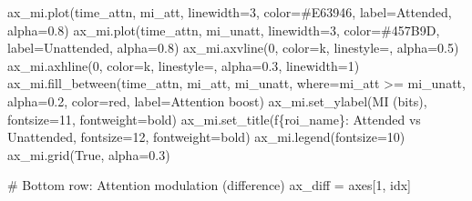 \documentclass[
  11pt,
  letterpaper,
  oneside,
  openany]{book}
\newenvironment{Shaded}{\begin{snugshade}}{\end{snugshade}}
\newcommand{\CommentTok}[1]{\textcolor[rgb]{0.37,0.37,0.37}{#1}}
\newcommand{\DecValTok}[1]{\textcolor[rgb]{0.68,0.00,0.00}{#1}}
\newcommand{\FloatTok}[1]{\textcolor[rgb]{0.68,0.00,0.00}{#1}}
\newcommand{\NormalTok}[1]{\textcolor[rgb]{0.00,0.23,0.31}{#1}}
\newcommand{\OperatorTok}[1]{\textcolor[rgb]{0.37,0.37,0.37}{#1}}
\newcommand{\SpecialCharTok}[1]{\textcolor[rgb]{0.37,0.37,0.37}{#1}}
\newcommand{\SpecialStringTok}[1]{\textcolor[rgb]{0.13,0.47,0.30}{#1}}
\newcommand{\StringTok}[1]{\textcolor[rgb]{0.13,0.47,0.30}{#1}}
\newcommand{\VariableTok}[1]{\textcolor[rgb]{0.07,0.07,0.07}{#1}}
\begin{document}
\begin{Shaded}
\begin{Highlighting}[]
\NormalTok{    ax\_mi.plot(time\_attn, mi\_att, linewidth}\OperatorTok{=}\DecValTok{3}\NormalTok{, color}\OperatorTok{=}\StringTok{\textquotesingle{}\#E63946\textquotesingle{}}\NormalTok{, }
\NormalTok{               label}\OperatorTok{=}\StringTok{\textquotesingle{}Attended\textquotesingle{}}\NormalTok{, alpha}\OperatorTok{=}\FloatTok{0.8}\NormalTok{)}
\NormalTok{    ax\_mi.plot(time\_attn, mi\_unatt, linewidth}\OperatorTok{=}\DecValTok{3}\NormalTok{, color}\OperatorTok{=}\StringTok{\textquotesingle{}\#457B9D\textquotesingle{}}\NormalTok{, }
\NormalTok{               label}\OperatorTok{=}\StringTok{\textquotesingle{}Unattended\textquotesingle{}}\NormalTok{, alpha}\OperatorTok{=}\FloatTok{0.8}\NormalTok{)}
\NormalTok{    ax\_mi.axvline(}\DecValTok{0}\NormalTok{, color}\OperatorTok{=}\StringTok{\textquotesingle{}k\textquotesingle{}}\NormalTok{, linestyle}\OperatorTok{=}\StringTok{\textquotesingle{}{-}{-}\textquotesingle{}}\NormalTok{, alpha}\OperatorTok{=}\FloatTok{0.5}\NormalTok{)}
\NormalTok{    ax\_mi.axhline(}\DecValTok{0}\NormalTok{, color}\OperatorTok{=}\StringTok{\textquotesingle{}k\textquotesingle{}}\NormalTok{, linestyle}\OperatorTok{=}\StringTok{\textquotesingle{}{-}\textquotesingle{}}\NormalTok{, alpha}\OperatorTok{=}\FloatTok{0.3}\NormalTok{, linewidth}\OperatorTok{=}\DecValTok{1}\NormalTok{)}
\NormalTok{    ax\_mi.fill\_between(time\_attn, mi\_att, mi\_unatt, where}\OperatorTok{=}\NormalTok{mi\_att }\OperatorTok{\textgreater{}=}\NormalTok{ mi\_unatt,}
\NormalTok{                       alpha}\OperatorTok{=}\FloatTok{0.2}\NormalTok{, color}\OperatorTok{=}\StringTok{\textquotesingle{}red\textquotesingle{}}\NormalTok{, label}\OperatorTok{=}\StringTok{\textquotesingle{}Attention boost\textquotesingle{}}\NormalTok{)}
\NormalTok{    ax\_mi.set\_ylabel(}\StringTok{\textquotesingle{}MI (bits)\textquotesingle{}}\NormalTok{, fontsize}\OperatorTok{=}\DecValTok{11}\NormalTok{, fontweight}\OperatorTok{=}\StringTok{\textquotesingle{}bold\textquotesingle{}}\NormalTok{)}
\NormalTok{    ax\_mi.set\_title(}\SpecialStringTok{f\textquotesingle{}}\SpecialCharTok{\{}\NormalTok{roi\_name}\SpecialCharTok{\}}\SpecialStringTok{: Attended vs Unattended\textquotesingle{}}\NormalTok{, fontsize}\OperatorTok{=}\DecValTok{12}\NormalTok{, fontweight}\OperatorTok{=}\StringTok{\textquotesingle{}bold\textquotesingle{}}\NormalTok{)}
\NormalTok{    ax\_mi.legend(fontsize}\OperatorTok{=}\DecValTok{10}\NormalTok{)}
\NormalTok{    ax\_mi.grid(}\VariableTok{True}\NormalTok{, alpha}\OperatorTok{=}\FloatTok{0.3}\NormalTok{)}
    
    \CommentTok{\# Bottom row: Attention modulation (difference)}
\NormalTok{    ax\_diff }\OperatorTok{=}\NormalTok{ axes[}\DecValTok{1}\NormalTok{, idx]}
    

\end{Highlighting}
\end{Shaded}
\end{document}
